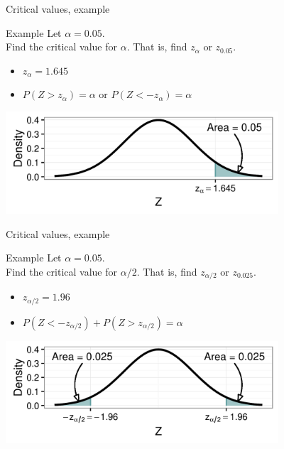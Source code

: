 \documentclass[xcolor=table, aspectratio=169, bigger, handout]{beamer}
\begin{document}
\begin{frame}{Critical values, example}
\begin{exampleblock}{Example}
Let $\alpha = 0.05$.\\
\medskip
Find the critical value for $\alpha$. That is, find $z_\alpha$ or $z_{0.05}$.
\begin{itemize}
\pause\item $z_\alpha = 1.645$
\item $P(Z > z_\alpha) = \alpha$ or $P(Z < -z_\alpha) = \alpha$
\end{itemize}
\end{exampleblock}
\smallskip
{\centering
\includegraphics[width=4in]{../images/wk06_crit1}
\par}

\end{frame}


\begin{frame}{Critical values, example}
\begin{exampleblock}{Example}
Let $\alpha = 0.05$.\\
\medskip
Find the critical value for $\alpha/2$. That is, find $z_{\alpha/2}$ or $z_{0.025}$.
\begin{itemize}
\pause\item $z_{\alpha/2} = 1.96$
\item $P(Z < -z_{\alpha/2}) + P(Z > z_{\alpha/2}) = \alpha$
\end{itemize}
\end{exampleblock}
\smallskip
{\centering
\includegraphics[width=4in]{../images/wk06_crit2}
\par}

\end{frame}
\end{document}
